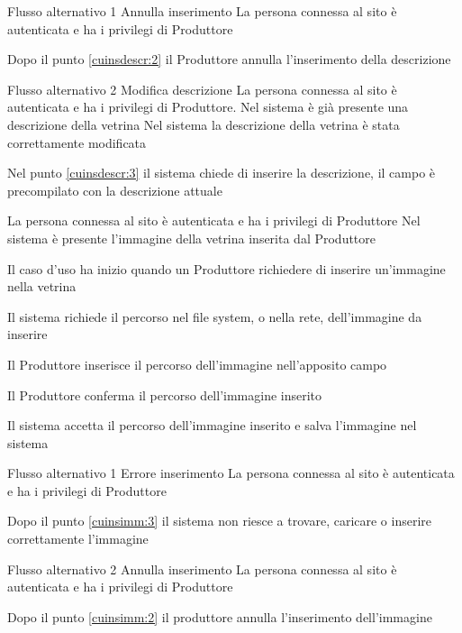 %
{Flusso alternativo 1}%
{Annulla inserimento}%
{La persona connessa al sito è autenticata e ha i privilegi di Produttore}%
{\postNulle}%
{\begin{enumCU}
		\item Dopo il punto \ref{cuinsdescr:2} il Produttore annulla l'inserimento della descrizione
	\end{enumCU}}%
%
{Flusso alternativo 2}%
{Modifica descrizione}%
{La persona connessa al sito è autenticata e ha i privilegi di Produttore. Nel sistema è già presente una descrizione della vetrina}%
{Nel sistema la descrizione della vetrina è stata correttamente modificata}%
{\begin{enumCU}
		\item Nel punto \ref{cuinsdescr:3} il sistema chiede di inserire la descrizione, il campo è precompilato con la descrizione attuale
	\end{enumCU}}%

\tabcuvspace

{}
{La persona connessa al sito è autenticata e ha i privilegi di Produttore}
{Nel sistema è presente l'immagine della vetrina inserita dal Produttore}
{\begin{enumCU}
		\item Il caso d'uso ha inizio quando un Produttore richiedere di inserire un'immagine nella vetrina
		\item Il sistema richiede il percorso nel file system, o nella rete, dell'immagine da inserire 
		\item Il Produttore inserisce il percorso dell'immagine nell'apposito campo \label{cuinsimm:2}
		\item Il Produttore conferma il percorso dell'immagine inserito \label{cuinsimm:3}
		\item Il sistema accetta il percorso dell'immagine inserito e salva l'immagine nel sistema
	\end{enumCU}}
%
{Flusso alternativo 1}%
{Errore inserimento}%
{La persona connessa al sito è autenticata e ha i privilegi di Produttore}%
{\postNulle}%
{\begin{enumCU}
		\item Dopo il punto \ref{cuinsimm:3} il sistema non riesce a trovare, caricare o inserire correttamente l'immagine
	\end{enumCU}}%
%
{Flusso alternativo 2}%
{Annulla inserimento}%
{La persona connessa al sito è autenticata e ha i privilegi di Produttore}%
{\postNulle}%
{\begin{enumCU}
		\item Dopo il punto \ref{cuinsimm:2} il produttore annulla l'inserimento dell'immagine
	\end{enumCU}}%

